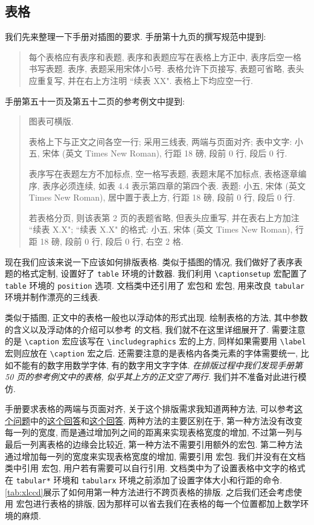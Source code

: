 \zhlipsum[1]

\subsection{表格}

我们先来整理一下手册对插图的要求. 手册第十九页的撰写规范中提到:
\begin{quote}
  每个表格应有表序和表题, 表序和表题应写在表格上方正中, 表序后空一格书写表题. 表序, 表题采用宋体小5号. 表格允许下页接写, 表题可省略, 表头应重复写, 并在右上方注明 {``\songti\upshape 续表 XX"}. 表格上下均应空一行.
\end{quote}
手册第五十一页及第五十二页的参考例文中提到:
\begin{quote}
  图表可横版.

  表格上下与正文之间各空一行;
  采用三线表, 两端与页面对齐;
  表中文字: 小五, 宋体 (英文 Times New Roman), 行距 18 磅, 段前 0 行, 段后 0 行.

  表序写在表题左方不加标点, 空一格写表题, 表题末尾不加标点, 表格逐章编序, 表序必须连续, 如表 4.4 表示第四章的第四个表. 表题: 小五, 宋体 (英文 Times New Roman), 居中置于表上方, 行距 18 磅, 段前 0 行, 段后 0 行.

  若表格分页, 则该表第 2 页的表题省略, 但表头应重写, 并在表右上方加注 ``续表 X.X";
  ``续表 X.X" 的格式: 小五, 宋体 (英文 Times New Roman), 行距 18 磅, 段前 0 行, 段后 0 行, 右空 2 格.
\end{quote}

现在我们应该来说一下应该如何排版表格. 类似于插图的情况, 我们做好了表序表题的格式定制, 设置好了 \verb|table| 环境的计数器. 我们利用 \verb|\captionsetup| 宏配置了 \verb|table| 环境的 \verb|position| 选项. 文档类中还引用了  宏包和  宏包, 用来改良 \verb|tabular| 环境并制作漂亮的三线表.

类似于插图, 正文中的表格一般也以浮动体的形式出现. 绘制表格的方法, 其中参数的含义以及浮动体的介绍可以参考  的文档, 我们就不在这里详细展开了. 需要注意的是 \verb|\caption| 宏应该写在 \verb|\includegraphics| 宏的上方, 同样如果需要用 \verb|\label| 宏则应放在 \verb|\caption| 宏之后. 还需要注意的是表格内各类元素的字体需要统一, 比如不能有的数字用数学字体, 有的数字用文字字体. \emph{在排版过程中我们发现手册第 50 页的参考例文中的表格, 似乎其上方的正文空了两行.} 我们并不准备对此进行模仿.

手册要求表格的两端与页面对齐, 关于这个排版需求我知道两种方法, 可以参考\href{https://tex.stackexchange.com/questions/10535}{这个问题}中的\href{https://tex.stackexchange.com/a/56552}{这个回答}和\href{https://tex.stackexchange.com/a/10540}{这个回答}. 两种方法的主要区别在于, 第一种方法没有改变每一列的宽度, 而是通过增加列之间的距离来实现表格宽度的增加, 不过第一列与最后一列离表格的边缘会比较近, 第一种方法不需要引用额外的宏包. 第二种方法通过增加每一列的宽度来实现表格宽度的增加, 需要引用  宏包. 我们并没有在文档类中引用  宏包, 用户若有需要可以自行引用. 文档类中为了设置表格中文字的格式在 \verb|tabular*| 环境和 \verb|tabularx| 环境之前添加了设置字体大小和行距的命令. \ref{tab:xlccd}展示了如何用第一种方法进行不跨页表格的排版. 之后我们还会考虑使用  宏包进行表格的排版, 因为那样可以省去我们在表格的每一个位置都加上数学环境的麻烦.

